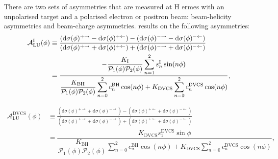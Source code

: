 There are two sets of asymmetries that are measured at H{\sc
ermes} with an unpolarised target and a polarised electron or positron beam:
beam-helicity asymmetries and beam-charge asymmetries.  results on the following asymmetries:
\begin{align}
\hspace{0.5cm}\mathcal{A}^{\textrm{I}}_{\textrm{LU}}(\phi) &\equiv
\frac{(\textrm{d}\sigma(\phi)^{+\rightarrow} -
\textrm{d}\sigma(\phi)^{+\leftarrow}) -
(\textrm{d}\sigma(\phi)^{-\rightarrow}
- \textrm{d}\sigma(\phi)^{-\leftarrow})}{(\textrm{d}\sigma(\phi)^{+\rightarrow}
+
\textrm{d}\sigma(\phi)^{+\leftarrow}) +
(\textrm{d}\sigma(\phi)^{-\rightarrow}
+ \textrm{d}\sigma(\phi)^{-\leftarrow})}&  \nonumber \\
&=\dfrac{-\dfrac{K_{\textrm{I}}}{\mathcal{P}_{1}(\phi)\mathcal{P}_{2}(\phi)}
\displaystyle\sum_{n=1}^2
s_{n}^{\textrm{I}}\sin(n\phi)}{\dfrac{K_{\textrm{BH}}}{\mathcal{P}_{1}
(\phi)\mathcal{P}_{
2}(\phi)}
\displaystyle\sum_{n=0}^2
c_{n}^{\textrm{BH}}\cos(n\phi) + 
K_{\textrm{DVCS}}\displaystyle\sum_{n=0}^2 c_{n}^{\textrm{DVCS}}\cos(n\phi)},& 
\label{e:alui}
\end{align}

\begin{align}
\mathcal{A}^{\textrm{DVCS}}_{\textrm{LU}}(\phi) &\equiv
\frac{(\textrm{d}\sigma(\phi)^{+\rightarrow} +
\textrm{d}\sigma(\phi)^{-\rightarrow}) -
(\textrm{d}\sigma(\phi)^{+\leftarrow} + 
\textrm{d}\sigma(\phi)^{-\leftarrow})}
{(\textrm{d}\sigma(\phi)^{+\rightarrow} +
\textrm{d}\sigma(\phi)^{-\rightarrow}) +
(\textrm{d}\sigma(\phi)^{+\leftarrow}
+ \textrm{d}\sigma(\phi)^{-\leftarrow})}&  \nonumber \\
&=\dfrac{K_{\textrm{DVCS}}
s_{1}^{\textrm{DVCS}}\sin\phi}{\dfrac{K_{\textrm{BH}}}{\mathcal{P}_{1}
(\phi)\mathcal{P}_{2}(\phi)}
\displaystyle\sum_{n=0}^2
c_{n}^{\textrm{BH}}\cos(n\phi) + 
K_{\textrm{DVCS}}\displaystyle\sum_{n=0}^2 c_{n}^{\textrm{DVCS}}\cos(n\phi)},&
\label{e:aludvcs}
\end{align}

